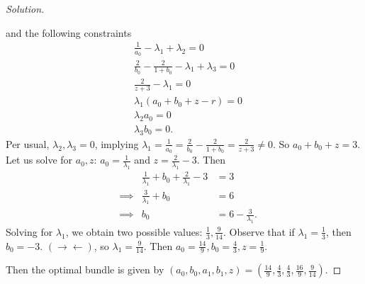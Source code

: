 \documentclass[12pt]{article}
\theoremstyle{definition}
\theoremstyle{remark}
\def\la{\lambda}
\def\contra{\rightarrow \leftarrow}
\begin{document}
\begin{proof}[Solution]
\begin{enumerate}
      and the following constraints
      \begin{align*}
        &\frac{1}{a_0} - \la_1 + \la_2 = 0 \\
        &\frac{2}{b_0} - \frac{2}{1 + b_0} - \la_1 + \la_3 = 0 \\
        &\frac{2}{z + 3} - \la_1 = 0 \\
        &\la_1(a_0 + b_0 + z - r) = 0 \\
        &\la_2a_0 = 0 \\
        &\la_3b_0 = 0.
      \end{align*}
      Per usual, $\la_2, \la_3 = 0$, implying $\la_1 = \frac{1}{a_0} = \frac{2}{b_0} - \frac{2}{1 + b_0} = \frac{2}{z + 3} \neq 0$. So $a_0 + b_0 + z = 3$. Let us solve for $a_0, z$: $a_0 = \frac{1}{\la_1}$ and $z = \frac{2}{\la_1} - 3$. Then
      \begin{align*}
        &          &\frac{1}{\la_1} + b_0 + \frac{2}{\la_1} - 3 &= 3 \\
        & \implies &\frac{3}{\la_1} + b_0 &= 6 \\
        & \implies &b_0 &= 6 - \frac{3}{\la_1}.
      \end{align*}
      Solving for $\la_1$, we obtain two possible values: $\frac{1}{3}, \frac{9}{14}$.
      Observe that if $\la_1 = \frac{1}{3}$, then $b_0 = -3$. $(\contra)$, so $\la_1 = \frac{9}{14}$.
      Then $a_0 = \frac{14}{9}, b_0 = \frac{4}{3}, z = \frac{1}{9}$.
  \end{enumerate}
  Then the optimal bundle is given by $(a_0, b_0, a_1, b_1, z) = (\frac{14}{9}, \frac{4}{3}, \frac{4}{3}, \frac{16}{9}, \frac{9}{14})$.
\end{proof}
\end{document}
